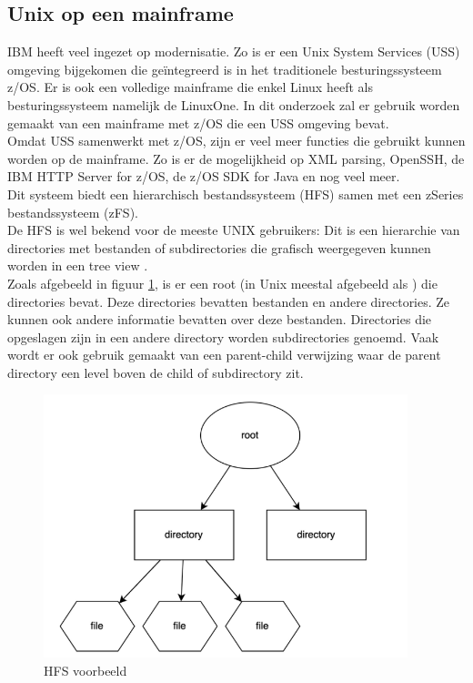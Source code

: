 \subsection{Unix op een mainframe}
IBM heeft veel ingezet op modernisatie. Zo is er een Unix System Services (USS) omgeving bijgekomen die geïntegreerd is in het traditionele besturingssysteem z/OS. Er is ook een volledige mainframe die enkel Linux heeft als besturingssysteem namelijk de LinuxOne. In dit onderzoek zal er gebruik worden gemaakt van een mainframe met z/OS die een USS omgeving bevat. \\

Omdat USS samenwerkt met z/OS, zijn er veel meer functies die gebruikt kunnen worden op de mainframe. Zo is er de mogelijkheid op XML parsing, OpenSSH, de IBM HTTP Server for z/OS, de z/OS SDK for Java en nog veel meer. \autocite{Dhawan2013} \\
 
Dit systeem biedt een hierarchisch bestandssysteem (HFS) samen met een zSeries bestandssysteem (zFS). \autocite{Precisely2020} \\ De HFS is wel bekend voor de meeste UNIX gebruikers: Dit is een hierarchie van directories met bestanden of subdirectories die grafisch weergegeven kunnen worden in een tree view \autocite{HCLTechnologies2022}. \\ 

Zoals afgebeeld in figuur \ref{fig:HFS}, is er een root (in Unix meestal afgebeeld als \textquote{/}) die directories bevat. Deze directories bevatten bestanden en andere directories. Ze kunnen ook andere informatie bevatten over deze bestanden. Directories die opgeslagen zijn in een andere directory worden subdirectories genoemd. Vaak wordt er ook gebruik gemaakt van een parent-child verwijzing waar de parent directory een level boven de child of subdirectory zit. \autocite{Codecadamy2022} \\

\begin{figure}[pt!]
    \centering
    \includegraphics[width=300pt]{./graphics/HFS.png}
    \caption{HFS voorbeeld \autocite{Codecadamy2022}}
    \label{fig:HFS}
\end{figure}

